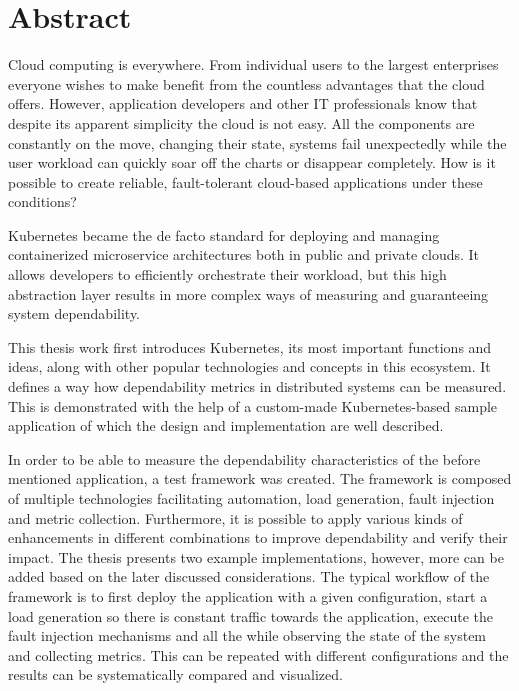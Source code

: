 \vfill
\selectenglish


\chapter*{Abstract}

Cloud computing is everywhere. From individual users to the largest enterprises everyone wishes to make benefit from the countless advantages that the cloud offers. However, application developers and other IT professionals know that despite its apparent simplicity the cloud is not easy. All the components are constantly on the move, changing their state, systems fail unexpectedly while the user workload can quickly soar off the charts or disappear completely. How is it possible to create reliable, fault-tolerant cloud-based applications under these conditions?

Kubernetes became the de facto standard for deploying and managing containerized microservice architectures both in public and private clouds. It allows developers to efficiently orchestrate their workload, but this high abstraction layer results in more complex ways of measuring and guaranteeing system dependability.

This thesis work first introduces Kubernetes, its most important functions and ideas, along with other popular technologies and concepts in this ecosystem. It defines a way how dependability metrics in distributed systems can be measured. This is demonstrated with the help of a custom-made Kubernetes-based sample application of which the design and implementation are well described.

In order to be able to measure the dependability characteristics of the before mentioned application, a test framework was created. The framework is composed of multiple technologies facilitating automation, load generation, fault injection and  metric collection. Furthermore, it is possible to apply various kinds of enhancements in different combinations to improve dependability and verify their impact. The thesis presents two example implementations, however, more can be added based on the later discussed considerations. The typical workflow of the framework is to first deploy the application with a given configuration, start a load generation so there is constant traffic towards the application, execute the fault injection mechanisms and all the while observing the state of the system and collecting metrics. This can be repeated with different configurations and the results can be systematically compared and visualized.


\vfill
\selectthesislanguage

\setcounter{romanPage}{\value{page}}
